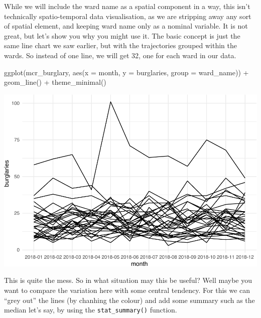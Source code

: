 \documentclass[
]{book}
\newenvironment{Shaded}{\begin{snugshade}}{\end{snugshade}}
\newcommand{\AttributeTok}[1]{\textcolor[rgb]{0.77,0.63,0.00}{#1}}
\newcommand{\FunctionTok}[1]{\textcolor[rgb]{0.00,0.00,0.00}{#1}}
\newcommand{\NormalTok}[1]{#1}
\newcommand{\SpecialCharTok}[1]{\textcolor[rgb]{0.00,0.00,0.00}{#1}}
\begin{document}
While we will include the ward name as a spatial component in a way, this isn't technically spatio-temporal data visualisation, as we are stripping away any sort of spatial element, and keeping ward name only as a nominal variable. It is not great, but let's show you why you might use it. The basic concept is just the same line chart we saw earlier, but with the trajectories grouped within the wards. So instead of one line, we will get 32, one for each ward in our data.

\begin{Shaded}
\begin{Highlighting}[]
\FunctionTok{ggplot}\NormalTok{(mcr\_burglary, }
       \FunctionTok{aes}\NormalTok{(}\AttributeTok{x =}\NormalTok{ month, }
           \AttributeTok{y =}\NormalTok{ burglaries, }
           \AttributeTok{group =}\NormalTok{ ward\_name)) }\SpecialCharTok{+} 
  \FunctionTok{geom\_line}\NormalTok{() }\SpecialCharTok{+} 
  \FunctionTok{theme\_minimal}\NormalTok{()}
\end{Highlighting}
\end{Shaded}

\includegraphics{crime_mapping_files/figure-latex/unnamed-chunk-181-1.pdf}

This is quite the mess. So in what situation may this be useful? Well maybe you want to compare the variation here with some central tendency. For this we can ``grey out'' the lines (by chanhing the colour) and add some summary such as the median let's say, by using the \texttt{stat\_summary()} function.
\end{document}
